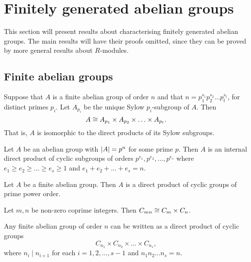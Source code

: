\section{Finitely generated abelian groups}
This section will present results about characterising finitely generated abelian groups. The main results will have their proofs omitted, since they can be proved by more general results about \(R\)-modules.

\subsection{Finite abelian groups}

\begin{theorem}
  Suppose that \(A\) is a finite abelian group of order \(n\) and that \(n = p_{1}^{s_{1}}p_{2}^{s_{2}} \ldots p_{t}^{s_{t}}\), for distinct primes \(p_{i}\). Let \(A_{p_{i}}\) be the unique Sylow \(p_{i}\)-subgroup of \(A\). Then
  \[A \cong A_{p_{1}} \times A_{p_{2}} \times \ldots \times A_{p_{t}}.\]
  That is, \(A\) is isomorphic to the direct products of its Sylow subgroups.
\end{theorem}


\begin{theorem}
  Let \(A\) be an abelian group with \(\abs{A} = p^{n}\) for some prime \(p\). Then \(A\) is an internal direct product of cyclic subgroups of orders \(p^{e_{1}}, p^{e_{2}}, \ldots, p^{{e_{s}}}\) where \(e_{1} \geq e_{2} \geq \ldots \geq e_{s} \geq 1\) and \(e_{1} + e_{2} + \ldots + e_{s} = n\).
\end{theorem}

\begin{theorem}\label{thm:group-theory:fundamental-theorem-of-finite-abelian-groups-I}
  Let \(A\) be a finite abelian group. Then \(A\) is a direct product of cyclic groups of prime power order.
\end{theorem}

\begin{theorem}
  Let \(m, n\) be non-zero coprime integers. Then \(C_{mn} \cong C_{m} \times C_{n}\).
\end{theorem}

\begin{corollary} \label{cor:group-theory:fundamental-theorem-of-finite-abelian-groups-II}
  Any finite abelian group of order \(n\) can be written as a direct product of cyclic groups
  \[C_{n_{1}} \times C_{{n_{2}}} \times \ldots \times C_{n_{s}},\]
  where \(n_{i} \mid n_{i+1}\) for each \(i = 1, 2, \ldots, s-1\) and \(n_{1}n_{2}\ldots n_{s} = n\).
\end{corollary}


